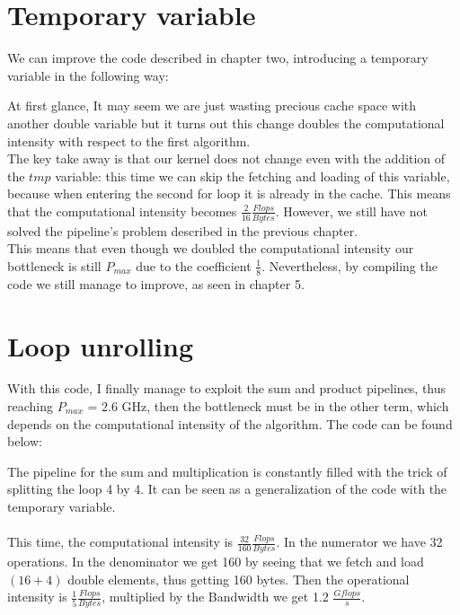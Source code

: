 \documentclass[11pt,a4paper,oneside,titlepage,openright]{book}
\begin{document}
\chapter{Temporary variable}

We can improve the code described in chapter two, introducing a temporary variable in the following way: 

At first glance, It may seem we are just wasting precious cache space with another double variable but it turns out this change doubles the computational intensity with respect to the first algorithm. \\
The key take away is that our kernel does not change even with the addition of the $\textit{tmp}$ variable: this time we can skip the fetching and loading of this variable, because when entering the second for loop it is already in the cache. This means that the computational intensity becomes $\frac{2}{16}\frac{Flops}{Bytes}$. 
However, we still have not solved the pipeline's problem described in the previous chapter. \\
This means that even though we doubled the computational intensity our bottleneck is still $P_{max}$ due to the coefficient $\frac{1}{8}$.  
Nevertheless, by compiling the code we still manage to improve, as seen in chapter 5.


\chapter{Loop unrolling}
With this code, I finally manage to exploit the sum and product pipelines, thus reaching $P_{max}$ = 2.6 GHz, then the bottleneck must be in the other term, which depends on the computational intensity of the algorithm. 
The code can be found below: 

The pipeline for the sum and multiplication is constantly filled with the trick of splitting the loop 4 by 4. It can be seen as a generalization of the code with the temporary variable. \\\\
This time, the computational intensity is $\frac{32}{160}\frac{Flops}{Bytes}$. In the numerator we have 32 operations. In the denominator we get 160 by seeing that we fetch and load $(16+4)$ double elements, thus getting 160 bytes. 
Then the operational intensity is $\frac{1}{5}\frac{Flops}{Bytes}$, multiplied by the Bandwidth we get 1.2 $\frac{Gflops}{s}$. 
\end{document}
